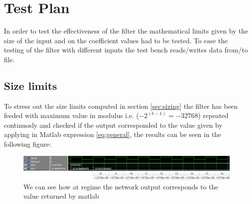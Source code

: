 \section{Test Plan}
In order to test the effectiveness of the filter the mathematical limits given by the size of the input and on the coefficient values had to be tested.
To ease the testing of the filter with different inputs the test bench reads/writes data from/to file.
\subsection{Size limits}
To stress out the size limits computed in section \ref{sec:sizing} the filter has been feeded with maximum value in modulus i.e. ($-2^(b-1)= -32768 $) repeated continuosly and checked if the output corresponded to the value given by applying in Matlab expression \ref{eq:general}, the results can be seen in the following figure:
\begin{figure}[H]
  \centering
  \includegraphics[width=0.9\linewidth]{./images/simul32768.PNG}
  \caption{We can see how at regime the network output corresponds to the value returned by matlab}
  \label{fig:32768}
\end{figure}